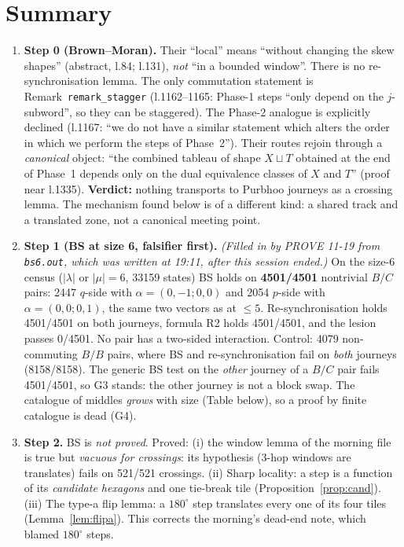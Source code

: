 \documentclass[11pt]{article}
\theoremstyle{definition}\newtheorem{definition}[theorem]{Definition}\newtheorem{remark}[theorem]{Remark}
\begin{document}
\section*{Summary}
\begin{enumerate}
\item \textbf{Step 0 (Brown--Moran).} Their ``local'' means ``without changing the skew shapes'' (abstract, l.84; l.131), \emph{not} ``in a bounded window''.
There is no re-synchronisation lemma. The only commutation statement is Remark~\texttt{remark\_stagger} (l.1162--1165: Phase-1 steps ``only depend on the $j$-subword'', so they can be staggered).
The Phase-2 analogue is explicitly declined (l.1167: ``we do not have a similar statement which alters the order in which we perform the steps of Phase~2'').
Their routes rejoin through a \emph{canonical} object: ``the combined tableau of shape $X\sqcup T$ obtained at the end of Phase~1 depends only on the dual equivalence classes of $X$ and $T$'' (proof near l.1335).
\textbf{Verdict:} nothing transports to Purbhoo journeys as a crossing lemma. The mechanism found below is of a different kind: a shared track and a translated zone, not a canonical meeting point.
\item \textbf{Step 1 (BS at size 6, falsifier first).} \emph{(Filled in by PROVE 11-19 from \texttt{bs6.out}, which was written at 19:11, after this session ended.)}
On the size-6 census ($|\lambda|$ or $|\mu|=6$, 33159 states) BS holds on \textbf{4501/4501} nontrivial $B/C$ pairs: 2447 $q$-side with $\alpha=(0,-1;0,0)$ and 2054 $p$-side with $\alpha=(0,0;0,1)$, the same two vectors as at $\le5$.
Re-synchronisation holds 4501/4501 on both journeys, formula R2 holds 4501/4501, and the lesion passes 0/4501. No pair has a two-sided interaction.
Control: 4079 non-commuting $B/B$ pairs, where BS and re-synchronisation fail on \emph{both} journeys (8158/8158). The generic BS test on the \emph{other} journey of a $B/C$ pair fails 4501/4501, so G3 stands: the other journey is not a block swap.
The catalogue of middles \emph{grows} with size (Table below), so a proof by finite catalogue is dead (G4).
\item \textbf{Step 2.} BS is \emph{not proved}. Proved: (i) the window lemma of the morning file is true but \emph{vacuous for crossings}: its hypothesis (3-hop windows are translates) fails on 521/521 crossings.
(ii) Sharp locality: a step is a function of its \emph{candidate hexagons} and one tie-break tile (Proposition~\ref{prop:cand}).
(iii) The type-a flip lemma: a $180^\circ$ step translates every one of its four tiles (Lemma~\ref{lem:flipa}). This corrects the morning's dead-end note, which blamed $180^\circ$ steps.

\end{enumerate}
\end{document}
